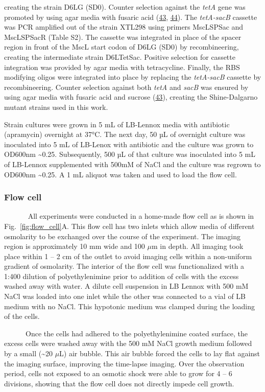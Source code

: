 creating
the
strain
D6LG
(SD0).
Counter
selection
against
the
\emph{tetA}
gene
was
promoted
by
using
agar
media
with
fusaric
acid
(\protect\hyperlink{ref-li2013}{43},
\protect\hyperlink{ref-bochner1980}{44}).
The
\emph{tetA-sacB}
cassette
was
PCR
amplified
out of
the
strain
XTL298
using
primers
MscLSPSac
and
MscLSPSacR
(Table
S2).
The
cassette
was
integrated
in
place
of the
spacer
region
in
front
of the
MscL
start
codon
of
D6LG
(SD0)
by
recombineering,
creating
the
intermediate
strain
D6LTetSac.
Positive
selection
for
cassette
integration
was
provided
by
agar
media
with
tetracycline.
Finally,
the
RBS
modifying
oligos
were
integrated
into
place
by
replacing
the
\emph{tetA-sacB}
cassette
by
recombineering.
Counter
selection
against
both
\emph{tetA}
and
\emph{sacB}
was
ensured
by
using
agar
media
with
fusaric
acid
and
sucrose
(\protect\hyperlink{ref-li2013}{43}),
creating
the
Shine-Dalgarno
mutant
strains
used
in
this
work.

Strain
cultures
were
grown
in 5
mL of
LB-Lennox
media
with
antibiotic
(apramycin)
overnight
at
37°C.
The
next
day,
50 µL
of
overnight
culture
was
inoculated
into 5
mL of
LB-Lenox
with
antibiotic
and
the
culture
was
grown
to
OD600nm
\textasciitilde{}0.25.
Subsequently,
500 µL
of
that
culture
was
inoculated
into 5
mL of
LB-Lennox
supplemented
with
500mM
of
NaCl
and
the
culture
was
regrown
to
OD600nm
\textasciitilde{}0.25.
A 1 mL
aliquot
was
taken
and
used
to
load
the
flow
cell.

\subsubsection{Flow
cell}\label{flow-cell}

~ ~ ~
~ All
experiments
were
conducted
in a
home-made
flow
cell
as is
shown
in
Fig.~\ref{fig:flow_cell}A.
This
flow
cell
has
two
inlets
which
allow
media
of
different
osmolarity
to be
exchanged
over
the
course
of the
experiment.
The
imaging
region
is
approximately
10 mm
wide
and
100
\(\mu\)m
in
depth.
All
imaging
took
place
within
1 -- 2
cm of
the
outlet
to
avoid
imaging
cells
within
a
non-uniform
gradient
of
osmolarity.
The
interior
of the
flow
cell
was
functionalized
with a
1:400
dilution
of
polyethylenimine
prior
to
addition
of
cells
with
the
excess
washed
away
with
water.
A
dilute
cell
suspension
in LB
Lennox
with
500 mM
NaCl
was
loaded
into
one
inlet
while
the
other
was
connected
to a
vial
of LB
medium
with
no
NaCl.
This
hypotonic
medium
was
clamped
during
the
loading
of the
cells.

~ ~ ~
~Once
the
cells
had
adhered
to the
polyethylenimine
coated
surface,
the
excess
cells
were
washed
away
with
the
500 mM
NaCl
growth
medium
followed
by a
small
(\textasciitilde{}20
\(\mu\)L)
air
bubble.
This
air
bubble
forced
the
cells
to lay
flat
against
the
imaging
surface,
improving
the
time-lapse
imaging.
Over
the
observation
period,
cells
not
exposed
to an
osmotic
shock
were
able
to
grow
for 4
-- 6
divisions,
showing
that
the
flow
cell
does
not
directly
impede
cell
growth.

